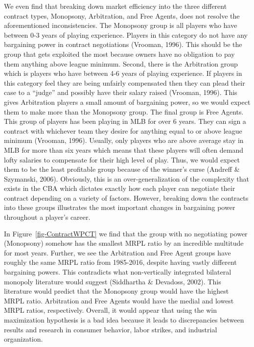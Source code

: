 \documentclass[
  12pt,
  letterpaper,
  DIV=11,
  numbers=noendperiod]{scrartcl}
\begin{document}
We even find that breaking down market efficiency into the three
different contract types, Monopsony, Arbitration, and Free Agents, does
not resolve the aforementioned inconsistencies. The Monopsony group is
all players who have between 0-3 years of playing experience. Players in
this category do not have any bargaining power in contract negotiations
(Vrooman, 1996). This should be the group that gets exploited the most
because owners have no obligation to pay them anything above league
minimum. Second, there is the Arbitration group which is players who
have between 4-6 years of playing experience. If players in this
category feel they are being unfairly compensated then they can plead
their case to a ``judge'' and possibly have their salary raised
(Vrooman, 1996). This gives Arbitration players a small amount of
bargaining power, so we would expect them to make more than the
Monopsony group. The final group is Free Agents. This group of players
has been playing in MLB for over 6 years. They can sign a contract with
whichever team they desire for anything equal to or above league minimum
(Vrooman, 1996). Usually, only players who are above average stay in MLB
for more than six years which means that these players will often demand
lofty salaries to compensate for their high level of play. Thus, we
would expect them to be the least profitable group because of the
winner's curse (Andreff \& Szymanski, 2006). Obviously, this is an
over-generalization of the complexity that exists in the CBA which
dictates exactly how each player can negotiate their contract depending
on a variety of factors. However, breaking down the contracts into these
groups illustrates the most important changes in bargaining power
throughout a player's career.

In Figure~\ref{fig-ContractWPCT} we find that the group with no
negotiating power (Monopsony) somehow has the smallest MRPL ratio by an
incredible multitude for most years. Further, we see the Arbitration and
Free Agent groups have roughly the same MRPL ratio from 1985-2016,
despite having vastly different bargaining powers. This contradicts what
non-vertically integrated bilateral monopoly literature would suggest
(Siddhartha \& Devadoss, 2002). This literature would predict that the
Monopsony group would have the highest MRPL ratio. Arbitration and Free
Agents would have the medial and lowest MRPL ratios, respectively.
Overall, it would appear that using the win maximization hypothesis is a
bad idea because it leads to discrepancies between results and research
in consumer behavior, labor strikes, and industrial organization.
\end{document}
